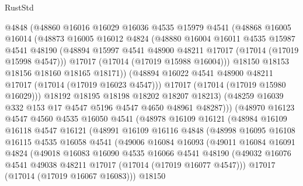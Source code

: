 \begin{lexlean}{RustStd}
\begin{coremodule}
{\begin{coremodule}
{{{{{{{{{{{{{{{{{{{{{{{{{{{{{{{{{{{{{{{{{{{{{{{{{{{{{{{                @4848
                (@48860
                  @16016
                  @16029
                  @16036
                  @4535
                  @15979
                  @4541
                  (@48868
                    @16005
                    @16014
                    (@48873
                      @16005
                      @16012
                      @4824
                      (@48880
                        @16004
                        @16011
                        @4535
                        @15987
                        @4541
                        @48190
                        (@48894 @15997 @4541 @48900 @48211 @17017 (@17014 (@17019 @15998 @4547)))
                        @17017
                        (@17014 (@17019 @15988 @16004)))
                      @18150
                      @18153
                      @18156
                      @18160
                      @18165
                      @18171))
                  (@48894 @16022 @4541 @48900 @48211 @17017 (@17014 (@17019 @16023 @4547)))
                  @17017
                  (@17014 (@17019 @15980 @16029)))
                @18192
                @18195
                @18198
                @18202
                @18207
                @18213)
              (@48259 @16039 @332 @153 @17 @4547 @5196 @4547 @4650 @48961 @48287)))
          (@48970
            @16123
            @4547
            @4560
            @4535
            @16050
            @4541
            (@48978
              @16109
              @16121
              (@48984
                @16109
                @16118
                @4547
                @16121
                (@48991
                  @16109
                  @16116
                  @4848
                  (@48998
                    @16095
                    @16108
                    @16115
                    @4535
                    @16058
                    @4541
                    (@49006
                      @16084
                      @16093
                      (@49011
                        @16084
                        @16091
                        @4824
                        (@49018
                          @16083
                          @16090
                          @4535
                          @16066
                          @4541
                          @48190
                          (@49032 @16076 @4541 @49038 @48211 @17017 (@17014 (@17019 @16077 @4547)))
                          @17017
                          (@17014 (@17019 @16067 @16083)))
                        @18150
}}}}}}}}}}}}}}}}}}}}}}}}}}}}}}}}}}}}}}}}}}}}}}}}}}}}}}}
\end{coremodule}}
\end{coremodule}
\end{lexlean}
